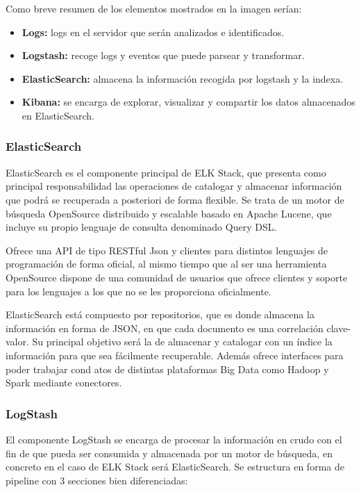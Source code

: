Como breve resumen de los elementos mostrados en la imagen serían:
\begin{itemize}
\item \textbf{Logs:} logs en el servidor que serán analizados e identificados.
\item \textbf{Logstash:} recoge logs y eventos que puede parsear y transformar.
\item \textbf{ElasticSearch:} almacena la información recogida por logstash y la indexa.
\item \textbf{Kibana:} se encarga de explorar, visualizar y compartir los datos almacenados en ElasticSearch.
\end{itemize}

\subsubsection{ElasticSearch}

ElasticSearch es el componente principal de ELK Stack, que presenta como principal responsabilidad las operaciones de catalogar y almacenar información que podrá se recuperada a posteriori de forma flexible. Se trata de un motor de búsqueda OpenSource distribuido y escalable basado en Apache Lucene, que incluye su propio lenguaje de consulta denominado Query DSL. 

Ofrece una API de tipo RESTful Json y clientes para distintos lenguajes de programación de forma oficial, al mismo tiempo que al ser una herramienta OpenSource dispone de una comunidad de usuarios que ofrece clientes y soporte para los lenguajes a los que no se les proporciona oficialmente.

ElasticSearch está compuesto por repositorios, que es donde almacena la información en forma de JSON, en que cada documento es una correlación clave-valor. Su principal objetivo será la de almacenar y catalogar con un índice la información para que sea fácilmente recuperable. Además ofrece interfaces para poder trabajar cond atos de distintas plataformas Big Data como Hadoop y Spark mediante conectores.

\subsubsection{LogStash}

El componente LogStash  se encarga de procesar la información en crudo con el fin de que pueda ser consumida y almacenada por un motor de búsqueda, en concreto en el caso de ELK Stack será ElasticSearch. Se estructura en forma de pipeline con 3 secciones bien diferenciadas:

